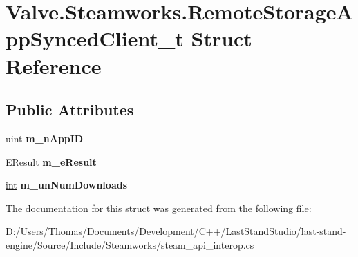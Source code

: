 \hypertarget{structValve_1_1Steamworks_1_1RemoteStorageAppSyncedClient__t}{}\section{Valve.\+Steamworks.\+Remote\+Storage\+App\+Synced\+Client\+\_\+t Struct Reference}
\label{structValve_1_1Steamworks_1_1RemoteStorageAppSyncedClient__t}
\subsection*{Public Attributes}
\begin{DoxyCompactItemize}
\item 
\hypertarget{structValve_1_1Steamworks_1_1RemoteStorageAppSyncedClient__t_a816081ba036a8e9e9153b101aa180a4b}{}uint {\bfseries m\+\_\+n\+App\+I\+D}\label{structValve_1_1Steamworks_1_1RemoteStorageAppSyncedClient__t_a816081ba036a8e9e9153b101aa180a4b}

\item 
\hypertarget{structValve_1_1Steamworks_1_1RemoteStorageAppSyncedClient__t_afb07fb91a87e42de88a15e92c3ab76b9}{}E\+Result {\bfseries m\+\_\+e\+Result}\label{structValve_1_1Steamworks_1_1RemoteStorageAppSyncedClient__t_afb07fb91a87e42de88a15e92c3ab76b9}

\item 
\hypertarget{structValve_1_1Steamworks_1_1RemoteStorageAppSyncedClient__t_a722bfe5522563907bc6a3308c5e86002}{}\hyperlink{SDL__thread_8h_a6a64f9be4433e4de6e2f2f548cf3c08e}{int} {\bfseries m\+\_\+un\+Num\+Downloads}\label{structValve_1_1Steamworks_1_1RemoteStorageAppSyncedClient__t_a722bfe5522563907bc6a3308c5e86002}

\end{DoxyCompactItemize}


The documentation for this struct was generated from the following file\+:\begin{DoxyCompactItemize}
\item 
D\+:/\+Users/\+Thomas/\+Documents/\+Development/\+C++/\+Last\+Stand\+Studio/last-\/stand-\/engine/\+Source/\+Include/\+Steamworks/steam\+\_\+api\+\_\+interop.\+cs\end{DoxyCompactItemize}
